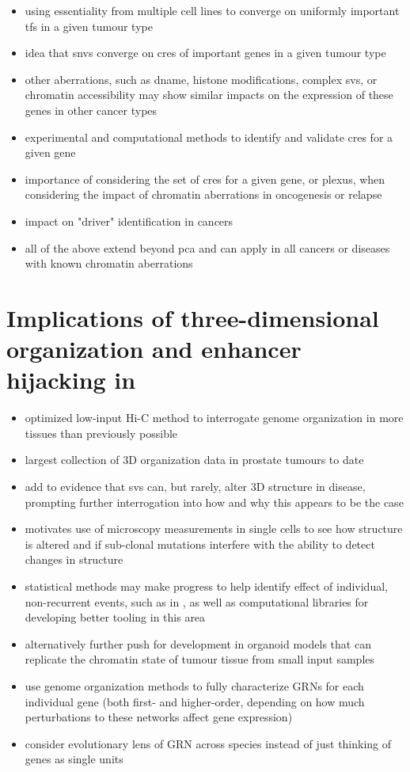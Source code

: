 \begin{itemize}
  \item using essentiality from multiple cell lines to converge on uniformly important \glspl{tf} in a given tumour type
  \item idea that \glspl{snv} converge on \glspl{cre} of important genes in a given tumour type
  \item other aberrations, such as \gls{dname}, histone modifications, complex \glspl{sv}, or chromatin accessibility may show similar impacts on the expression of these genes in other cancer types
  \item experimental and computational methods to identify and validate \glspl{cre} for a given gene
  \item importance of considering the set of \glspl{cre} for a given gene, or plexus, when considering the impact of chromatin aberrations in oncogenesis or relapse
  \item impact on "driver" identification in cancers
  \item all of the above extend beyond \gls{pca} and can apply in all cancers or diseases with known chromatin aberrations
\end{itemize}

\section{Implications of three-dimensional organization and enhancer hijacking in }

\begin{itemize}
  \item optimized low-input Hi-C method to interrogate genome organization in more tissues than previously possible
  \item largest collection of 3D organization data in prostate tumours to date
  \item add to evidence that \glspl{sv} can, but rarely, alter 3D structure in disease, prompting further interrogation into how and why this appears to be the case
  \item motivates use of microscopy measurements in single cells to see how structure is altered and if sub-clonal mutations interfere with the ability to detect changes in structure
  \item statistical methods may make progress to help identify effect of individual, non-recurrent events, such as in , as well as computational libraries for developing better tooling in this area
  \item alternatively further push for development in organoid models that can replicate the chromatin state of tumour tissue from small input samples
  \item use genome organization methods to fully characterize GRNs for each individual gene (both first- and higher-order, depending on how much perturbations to these networks affect gene expression)
  \item consider evolutionary lens of GRN across species instead of just thinking of genes as single units
\end{itemize}

